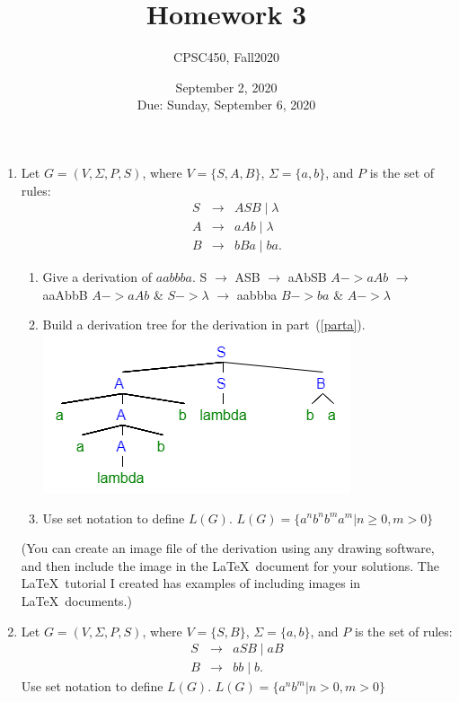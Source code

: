\documentclass{article}
\title{Homework 3}
\author{CPSC450, Fall2020}
\date{September 2, 2020\\
Due: Sunday, September 6, 2020}
\begin{document}
\maketitle

\begin{enumerate}

\item Let $G = (V, \Sigma, P, S)$, where $V = \{S, A, B\}$, $\Sigma =
  \{a, b\}$, and $P$ is the set of rules:
\begin{eqnarray*}
S &\rightarrow& ASB \mid \lambda\\
A &\rightarrow& aAb \mid \lambda\\
B &\rightarrow& bBa \mid ba.
\end{eqnarray*}
\begin{enumerate}
\item\label{parta} Give a derivation of $aabbba$.
\newline S $\rightarrow$ ASB
\newline $\rightarrow$ aAbSB $A->aAb$
\newline $\rightarrow$ aaAbbB $A->aAb $ \& $ S-> \lambda$
\newline $\rightarrow$ aabbba $B->ba  $ \& $ A-> \lambda$
\item Build a derivation tree for the derivation in
  part~(\ref{parta}).\newline
  \includegraphics[scale=0.75]{Derivation.png}
\item Use set notation to define $L(G)$.
\newline $L(G) = \{a^nb^nb^ma^m|n\geq0, m>0\}$
\end{enumerate}

(You can create an image file of the derivation using any drawing
software, and then include the image in the \LaTeX\ document for your
solutions. The \LaTeX\ tutorial I created has examples of including
images in \LaTeX\ documents.)

\item Let $G = (V, \Sigma, P, S)$, where $V = \{S, B\}$, $\Sigma =
  \{a, b\}$, and $P$ is the set of rules:
\begin{eqnarray*}
S &\rightarrow& aSB \mid aB\\
B &\rightarrow& bb \mid b.
\end{eqnarray*}
Use set notation to define $L(G)$.
\newline $L(G) = \{a^nb^m|n>0,m>0\}$


\end{enumerate}
\end{document}
